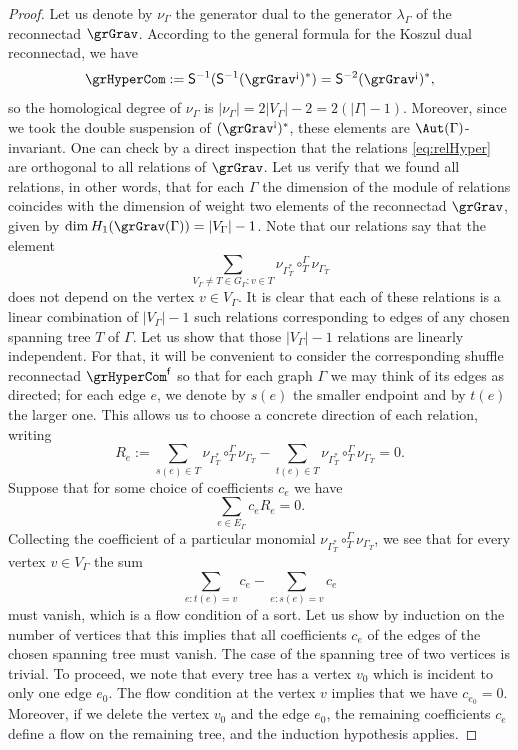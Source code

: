 \begin{proof}
Let us denote by $\nu_{\Gamma}$ the generator dual to the generator $\lambda_{\Gamma}$ of the reconnectad $\grGrav$. According to the general formula for the Koszul dual reconnectad, we have 
 \[
\grHyperCom := \mathsf{S}^{-1}(\mathsf{S}^{-1}(\grGrav^{\text{!`}})^*)=\mathsf{S}^{-2}(\grGrav^{\text{!`}})^*,
 \]
so the homological degree of $\nu_{\Gamma}$ is $|\nu_{\Gamma}|=2|V_\Gamma|-2=2(|\Gamma|-1)$. Moreover, since we took the double suspension of $(\grGrav^{\text{!`}})^*$, these elements are $\Aut(\Gamma)$-invariant. One can check by a direct inspection that the relations \eqref{eq:relHyper} are orthogonal to all relations of $\grGrav$. Let us verify that we found all relations, in other words, that for each $\Gamma$ the dimension of the module of relations coincides with the dimension of weight two elements of the reconnectad $\grGrav$, given by 
$\dim H_1(\grGrav(\Gamma))=|V_\Gamma|-1$. Note that our relations say that the element 
 \[
\sum_{V_\Gamma\ne T\in G_\Gamma\colon v \in T} \nu_{\Gamma^*_T}\circ_T^{\Gamma} \nu_{\Gamma_T}  \]
does not depend on the vertex $v\in V_\Gamma$. It is clear that each of these relations is a linear combination of $|V_\Gamma|-1$ such relations corresponding to edges of any chosen spanning tree $T$ of $\Gamma$. Let us show that those $|V_\Gamma|-1$ relations are linearly independent. For that, it will be convenient to consider the corresponding shuffle reconnectad $\grHyperCom^{\mathsf{f}}$ so that for each graph $\Gamma$ we may think of its edges as directed; for each edge $e$, we denote by $s(e)$ the smaller endpoint and by $t(e)$ the larger one. This allows us to choose a concrete direction of each relation, writing 
 \[
R_e:=\sum_{s(e) \in T} \nu_{\Gamma^*_T}\circ_T^{\Gamma} \nu_{\Gamma_T} -
\sum_{t(e) \in T} \nu_{\Gamma^*_T}\circ_T^{\Gamma} \nu_{\Gamma_T}=0.
 \]
Suppose that for some choice of coefficients $c_e$ we have
 \[
\sum_{e \in E_\Gamma} c_eR_e=0.
 \] 
Collecting the coefficient of a particular monomial $\nu_{\Gamma^*_T}\circ_T^{\Gamma} \nu_{\Gamma_T}$, we see that for every vertex $v \in V_\Gamma$ the sum 
 \[
\sum_{e\colon t(e)=v} c_e - \sum_{e\colon s(e)=v} c_e
 \]
must vanish, which is a flow condition of a sort. Let us show by induction on the number of vertices that this implies that all coefficients $c_e$ of the edges of the chosen spanning tree must vanish. The case of the spanning tree of two vertices is trivial. To proceed, we note that every tree has a vertex $v_0$ which is incident to only one edge $e_0$. The flow condition at the vertex $v$ implies that we have $c_{e_0}=0$. Moreover, if we delete the vertex $v_0$ and the edge $e_0$, the remaining coefficients $c_e$ define a flow on the remaining tree, and the induction hypothesis applies. 
\end{proof}

